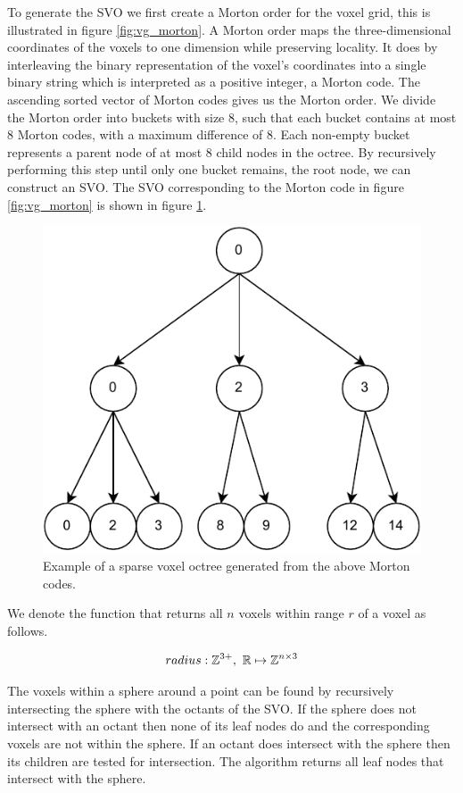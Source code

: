 To generate the SVO we first create a Morton order for the voxel grid, this is illustrated in figure \ref{fig:vg_morton}. A Morton order maps the three-dimensional coordinates of the voxels to one dimension while preserving locality. It does by interleaving the binary representation of the voxel's coordinates into a single binary string which is interpreted as a positive integer, a Morton code. The ascending sorted vector of Morton codes gives us the Morton order. We divide the Morton order into buckets with size 8, such that each bucket contains at most 8 Morton codes, with a maximum difference of 8. Each non-empty bucket represents a parent node of at most 8 child nodes in the octree. By recursively performing this step until only one bucket remains, the root node, we can construct an SVO. The SVO corresponding to the Morton code in figure \ref{fig:vg_morton} is shown in figure \ref{fig:vg_svo}.

\begin{figure}[h]
    \centering
    \includegraphics*[width=.5\textwidth]{./fig/svo.pdf}
    \caption{Example of a sparse voxel octree generated from the above Morton codes.}
    \label{fig:vg_svo}
\end{figure}

We denote the function that returns all \(n\) voxels within range \(r\) of a voxel as follows.

\begin{equation}
    radius: \mathbb{Z}^{3+},\ \mathbb{R} \mapsto \mathbb{Z}^{n \times 3}
\end{equation}

The voxels within a sphere around a point can be found by recursively intersecting the sphere with the octants of the SVO. If the sphere does not intersect with an octant then none of its leaf nodes do and the corresponding voxels are not within the sphere. If an octant does intersect with the sphere then its children are tested for intersection. The algorithm returns all leaf nodes that intersect with the sphere.


